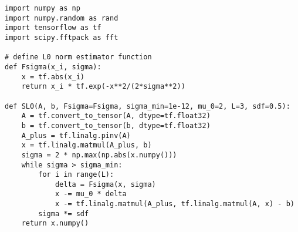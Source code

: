 \begin{lstlisting}
import numpy as np
import numpy.random as rand
import tensorflow as tf
import scipy.fftpack as fft

# define L0 norm estimator function
def Fsigma(x_i, sigma):
	x = tf.abs(x_i)
	return x_i * tf.exp(-x**2/(2*sigma**2))

def SL0(A, b, Fsigma=Fsigma, sigma_min=1e-12, mu_0=2, L=3, sdf=0.5):
	A = tf.convert_to_tensor(A, dtype=tf.float32)
	b = tf.convert_to_tensor(b, dtype=tf.float32)
	A_plus = tf.linalg.pinv(A)
	x = tf.linalg.matmul(A_plus, b)
	sigma = 2 * np.max(np.abs(x.numpy()))
	while sigma > sigma_min:
		for i in range(L):
			delta = Fsigma(x, sigma)
			x -= mu_0 * delta
			x -= tf.linalg.matmul(A_plus, tf.linalg.matmul(A, x) - b)
		sigma *= sdf
	return x.numpy()
\end{lstlisting}


